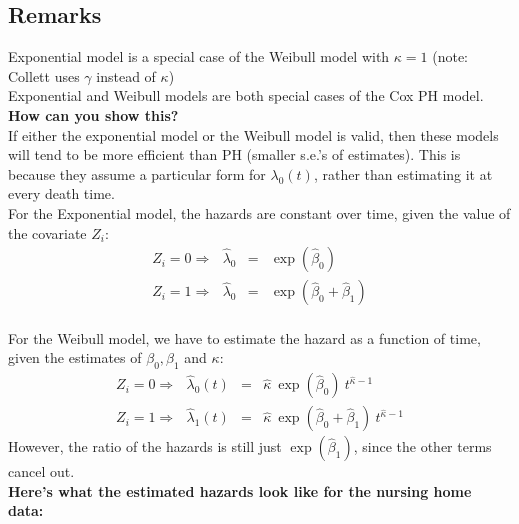 \documentclass[11pt,psfig]{book}
\begin{document}
\subsection{Remarks}
Exponential model is a special case of the Weibull model
with $\kappa=1$ (note: Collett uses $\gamma$ instead of $\kappa$)
\\[2ex]
Exponential and Weibull models are both special cases of the Cox
PH model.
\\[2ex]
{\bf How can you show this?}
\\[2ex]
If either the exponential model or the Weibull model is valid,
then these models will tend to be more efficient than PH (smaller
s.e.'s of estimates).  This is because they assume a particular
form for $\lambda_0(t)$, rather than estimating it at every death
time.
\\[2ex]
For the Exponential model, the hazards are constant over time, given
the value of the covariate $Z_i$:
\begin{eqnarray*}
Z_i=0 \Rightarrow~~~
\hat\lambda_0 & = & \exp(\hat\beta_0)\\[1ex]
Z_i=1 \Rightarrow~~~
\hat\lambda_0 & = & \exp(\hat\beta_0+\hat\beta_1)
\end{eqnarray*}
\\[2ex]
For the Weibull model, we have to estimate the hazard as a
function of time, given the estimates of $\beta_0, \beta_1$ and $\kappa$:
\begin{eqnarray*}
Z_i=0 \Rightarrow~~~
\hat\lambda_0(t) & = & \hat\kappa ~\exp(\hat\beta_0) ~t^{\hat\kappa-1}\\[1ex]
Z_i=1 \Rightarrow~~~
\hat\lambda_1(t) & = & \hat\kappa ~\exp(\hat\beta_0+\hat\beta_1)
~t^{\hat\kappa-1}
\end{eqnarray*}
However, the ratio of the hazards is still just $\exp(\hat\beta_1)$,
since the other terms cancel out.
\\[2ex]
{\bf Here's what the estimated hazards look like for the
nursing home data:}
\end{document}
